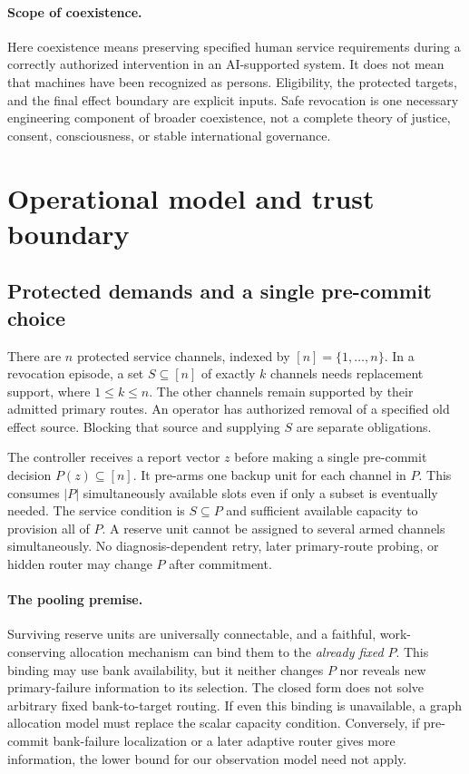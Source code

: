 \documentclass[11pt,a4paper]{article}
\theoremstyle{definition}\newtheorem{definition}{Definition}
\begin{document}
\paragraph{Scope of coexistence.}
Here coexistence means preserving specified human service requirements during a correctly authorized intervention in an AI-supported system. It does not mean that machines have been recognized as persons. Eligibility, the protected targets, and the final effect boundary are explicit inputs. Safe revocation is one necessary engineering component of broader coexistence, not a complete theory of justice, consent, consciousness, or stable international governance.

\section{Operational model and trust boundary}
\label{sec:model}
\subsection{Protected demands and a single pre-commit choice}
There are $n$ protected service channels, indexed by $[n]=\{1,\ldots,n\}$. In a revocation episode, a set $S\subseteq[n]$ of exactly $k$ channels needs replacement support, where $1\leq k\leq n$. The other channels remain supported by their admitted primary routes. An operator has authorized removal of a specified old effect source. Blocking that source and supplying $S$ are separate obligations.

The controller receives a report vector $z$ before making a single pre-commit decision $P(z)\subseteq[n]$. It pre-arms one backup unit for each channel in $P$. This consumes $|P|$ simultaneously available slots even if only a subset is eventually needed. The service condition is $S\subseteq P$ and sufficient available capacity to provision all of $P$. A reserve unit cannot be assigned to several armed channels simultaneously. No diagnosis-dependent retry, later primary-route probing, or hidden router may change $P$ after commitment.

\paragraph{The pooling premise.}
Surviving reserve units are universally connectable, and a faithful, work-conserving allocation mechanism can bind them to the \emph{already fixed} $P$. This binding may use bank availability, but it neither changes $P$ nor reveals new primary-failure information to its selection. The closed form does not solve arbitrary fixed bank-to-target routing. If even this binding is unavailable, a graph allocation model must replace the scalar capacity condition. Conversely, if pre-commit bank-failure localization or a later adaptive router gives more information, the lower bound for our observation model need not apply.
\end{document}
